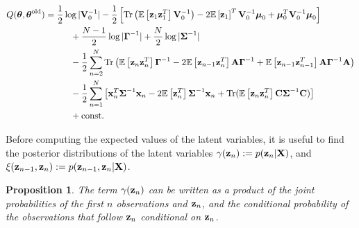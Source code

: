 \documentclass[11pt]{article}
\newtheorem{proposition}{Proposition}[section]
\begin{document}
\begin{align}
	Q(\boldsymbol\theta, \boldsymbol\theta^\text{old}) &= \frac{1}{2}\log \vert
	  {\bf V}_0^{-1}\vert -\frac{1}{2}\left[\text{Tr}\left(\mathbb{E}\left[{\bf z}_1 {\bf z}_1^T\right] {\bf V}_0^{-1}\right) -2 \mathbb{E}\left[{\bf z}_1\right]^T{\bf V}_0^{-1}\boldsymbol\mu_0 + \boldsymbol\mu_0^T {\bf V}_0^{-1}\boldsymbol\mu_0\right] \nonumber \\
	  &\hspace{1cm}+ \frac{N-1}{2}\log\vert\boldsymbol\Gamma^{-1}\vert + \frac{N}{2}\log\vert \boldsymbol\Sigma^{-1}\vert \nonumber \\
	  &\hspace{1cm}-\frac{1}{2} \sum_{n=2}^{N}\text{Tr}\left(\mathbb{E}\left[{\bf z}_n{\bf z}_n^T\right]\boldsymbol\Gamma^{-1} -2\mathbb{E}\left[ {\bf z}_{n-1}{\bf z}_n^T\right]{\bf A}\boldsymbol\Gamma^{-1} + \mathbb{E}\left[{\bf z}_{n-1}{\bf z}_{n-1}^T\right]{\bf A}\boldsymbol\Gamma^{-1}{\bf A}\right) \nonumber\\
	  &\hspace{1cm}-\frac{1}{2}\sum_{n=1}^N\left[{\bf x}_n^T\boldsymbol{\Sigma}^{-1}{\bf x}_n-2\mathbb{E}\left[{\bf z}_n^T\right]\boldsymbol\Sigma^{-1}{\bf x}_n + \text{Tr}(\mathbb{E}\left[{\bf z}_n{\bf z}_n^T\right]{\bf C}\boldsymbol\Sigma^{-1}{\bf C})\right] \nonumber\\
	  &\hspace{1cm} + \text{const.} \label{eq:Q-LDS}
\end{align}

Before computing the expected values of the latent variables, it is useful to find the posterior distributions of the latent variables $\gamma({\bf z}_n) := p({\bf z}_n\vert {\bf X})$, and $\xi({\bf z}_{n-1}, {\bf z}_{n}) := p({\bf z}_{n-1}, {\bf z}_n\vert {\bf X})$. %

\begin{proposition}
	The term $\gamma({\bf z}_n)$ can be written as a product of the joint probabilities of the first $n$ observations and ${\bf z}_n$, and the conditional probability of the observations that follow ${\bf z}_n$ conditional on ${\bf z}_n$.
\end{proposition}
\end{document}
